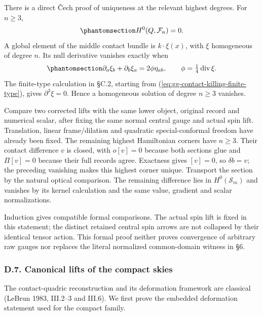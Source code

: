 \documentclass[
  english,
  11pt,
  reqno]{amsart}
\begin{document}
There is a direct Čech proof of uniqueness at the relevant highest
degrees. For \(n\ge3\),
\begin{equation}\protect\phantomsection\label{eq:gg-app-no-high-contact-corners}{
 H^0(Q,\mathcal F_n)=0.
}\end{equation} A global element of the middle contact bundle is
\(k\cdot\xi(x)\), with \(\xi\) homogeneous of degree \(n\). Its null
derivative vanishes exactly when
\begin{equation}\protect\phantomsection\label{eq:gg-app-conformal-killing-equation}{
 \partial_a\xi_b+\partial_b\xi_a=2\phi\eta_{ab},\qquad
 \phi=\tfrac14\operatorname{div}\xi.
}\end{equation} The finite-type calculation in §C.2, starting from
(\ref{eq:gg-contact-killing-finite-type}), gives \(\partial^3\xi=0\).
Hence a homogeneous solution of degree \(n\ge3\) vanishes.

Compare two corrected lifts with the same lower object, original record
and numerical scalar, after fixing the same normal central gauge and
actual spin lift. Translation, linear frame/dilation and quadratic
special-conformal freedom have already been fixed. The remaining highest
Hamiltonian corners have \(n\ge3\). Their contact difference \(v\) is
closed, with \(o[v]=0\) because both sections glue and \(\Pi[v]=0\)
because their full records agree. Exactness gives \([v]=0\), so
\(\delta b=v\); the preceding vanishing makes this highest corner
unique. Transport the section by the natural optical comparison. The
remaining difference lies in \(H^0(\mathcal S_m)\) and vanishes by its
kernel calculation and the same value, gradient and scalar
normalizations.

Induction gives compatible formal comparisons. The actual spin lift is
fixed in this statement; the distinct retained central spin arrows are
not collapsed by their identical tensor action. This formal proof
neither proves convergence of arbitrary raw gauges nor replaces the
literal normalized common-domain witness in §6.

\protect{}\label{sec:gg-affine-compact-lifts}

\subsubsection{D.7. Canonical lifts of the compact
skies}\label{d.7.-canonical-lifts-of-the-compact-skies}

The contact-quadric reconstruction and its deformation framework are
classical (LeBrun 1983, III.2--3 and III.6). We first prove the embedded
deformation statement used for the compact family.
\end{document}
